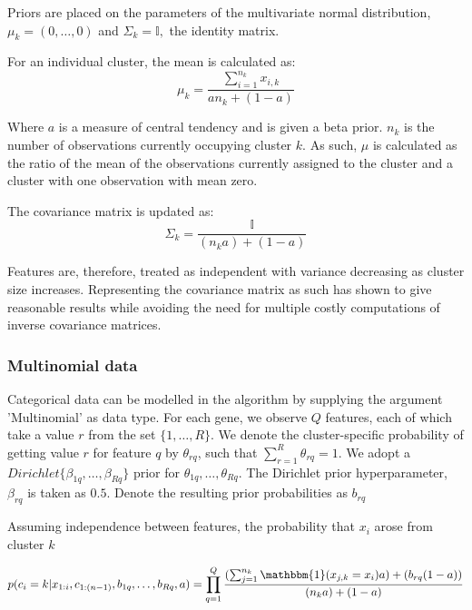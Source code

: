 \documentclass[10pt,a4paper]{article}
\begin{document}
Priors are placed on the parameters of the multivariate normal distribution, $\mu_k = (0, \dots, 0)$ and $\Sigma_k = \mathbb{I},$ the identity matrix.

For an individual cluster, the mean is calculated as:
\begin{equation}
\mu_k = \frac{\displaystyle{\sum_{i = 1}^{n_k} x_{i, k}}}{a n_k + (1 - a)}
\end{equation}

Where $a$ is a measure of central tendency and is given a beta prior. $n_k$ is the number of observations currently occupying cluster $k$. As such, $\mu$ is calculated as the ratio of the mean of the observations currently assigned to the cluster and a cluster with one observation with mean zero.

The covariance matrix is updated as:
\begin{equation}
\Sigma_k = \frac{\mathbb{I}}{(n_{k}a) + (1 - a)}
\end{equation}

Features are, therefore, treated as independent with variance decreasing as cluster size increases. Representing the covariance matrix as such has shown to give reasonable results while avoiding the need for multiple costly computations of inverse covariance matrices.


\subsubsection*{Multinomial data}
Categorical data can be modelled in the algorithm by supplying the argument 'Multinomial' as data type. For each gene, we observe $Q$ features, each of which take a value $r$ from the set $\{1, \dots, R\}$. We denote the cluster-specific probability of getting value $r$ for feature $q$ by $\theta_{rq}$, such that $\displaystyle{\sum_{r = 1}^{R}} \theta_{rq} = 1$. We adopt a $Dirichlet\{\beta_{1q}, \dots, \beta_{Rq}\}$ prior for $\theta_{1q}, \dots, \theta_{Rq}$. The Dirichlet prior hyperparameter, $\beta_{rq}$ is taken as $0.5$. Denote the resulting prior probabilities as $b_{rq}$

Assuming independence between features, the probability that $x_i$ arose from cluster $k$

\begin{equation}
p(c_{i} = k| x_{1:i}, c_{1:(n - 1)},b_{1q}, \dots, b_{Rq}, a) = 
\prod_{q = 1}^{Q} 
\frac{(\sum_{j = 1}^{n_{k}}\mathbbm{1}(x_{j, k} = x_i) a) + (b_{rq}(1 - a))}
{(n_{k} a) + (1 - a)}
\end{equation}
\end{document}

